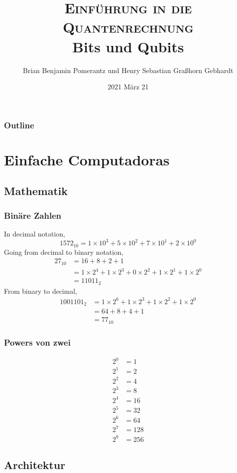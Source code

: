 \documentclass{beamer}
\title[Quantenrechnung]{\textsc{Einführung in die Quantenrechnung} \\ Bits und Qubits} %
\author[bbphsgg@ma.eu]{Brian Benjamin Pomerantz und Henry Sebastian Graßhorn Gebhardt} %
\institute[] %
{
P\&GG Monotechnische Anstalt\\ %
}
\date{2021 M\"arz 21} %
\begin{document}
\begin{frame}
\titlepage %
\end{frame}

\begin{frame}
\frametitle{Outline}
\tableofcontents
\end{frame}


\section{Einfache Computadoras}
\subsection{Mathematik}

\begin{frame}
\frametitle{Bin\"are Zahlen}
In decimal notation,
\begin{equation*}
1572_{10} = 1\times10^3 + 5\times10^2 + 7\times10^1 + 2\times10^0
\end{equation*}
Going from decimal to binary notation,
\begin{align*}
27_{10} &= 16 + 8 + 2 + 1 \\
&= 1\times2^4 + 1\times2^3 + 0\times2^2 + 1\times2^1 + 1\times2^0 \\
&= 11011_2
\end{align*}
From binary to decimal,
\begin{align*}
1001101_2 &= 1\times2^6 + 1\times2^3 + 1\times2^2 + 1\times2^0 \\
&= 64 + 8 + 4 + 1 \\
&= 77_{10}
\end{align*}
\end{frame}

\begin{frame}
\frametitle{Powers von zwei}
\begin{align*}
2^0 &= 1 \\
2^1 &= 2 \\
2^2 &= 4 \\
2^3 &= 8 \\
2^4 &= 16 \\
2^5 &= 32 \\
2^6 &= 64 \\
2^7 &= 128 \\
2^8 &= 256
\end{align*}
\end{frame}

\subsection{Architektur}
\end{document}
